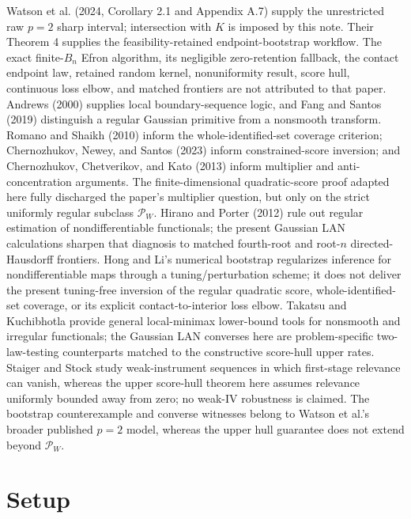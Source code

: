 \documentclass{article}
\begin{document}
Watson et al. (2024, Corollary 2.1 and Appendix A.7) supply the unrestricted raw \(p=2\) sharp interval; intersection with \(K\) is imposed by this note. Their Theorem 4 supplies the feasibility-retained endpoint-bootstrap workflow. The exact finite-\(B_n\) Efron algorithm, its negligible zero-retention fallback, the contact endpoint law, retained random kernel, nonuniformity result, score hull, continuous loss elbow, and matched frontiers are not attributed to that paper. Andrews (2000) supplies local boundary-sequence logic, and Fang and Santos (2019) distinguish a regular Gaussian primitive from a nonsmooth transform. Romano and Shaikh (2010) inform the whole-identified-set coverage criterion; Chernozhukov, Newey, and Santos (2023) inform constrained-score inversion; and Chernozhukov, Chetverikov, and Kato (2013) inform multiplier and anti-concentration arguments. The finite-dimensional quadratic-score proof adapted here fully discharged the paper's multiplier question, but only on the strict uniformly regular subclass \(\mathcal P_W\). Hirano and Porter (2012) rule out regular estimation of nondifferentiable functionals; the present Gaussian LAN calculations sharpen that diagnosis to matched fourth-root and root-\(n\) directed-Hausdorff frontiers. Hong and Li's numerical bootstrap regularizes inference for nondifferentiable maps through a tuning/perturbation scheme; it does not deliver the present tuning-free inversion of the regular quadratic score, whole-identified-set coverage, or its explicit contact-to-interior loss elbow. Takatsu and Kuchibhotla provide general local-minimax lower-bound tools for nonsmooth and irregular functionals; the Gaussian LAN converses here are problem-specific two-law-testing counterparts matched to the constructive score-hull upper rates. Staiger and Stock study weak-instrument sequences in which first-stage relevance can vanish, whereas the upper score-hull theorem here assumes relevance uniformly bounded away from zero; no weak-IV robustness is claimed. The bootstrap counterexample and converse witnesses belong to Watson et al.'s broader published \(p=2\) model, whereas the upper hull guarantee does not extend beyond \(\mathcal P_W\).

\section{Setup}
\end{document}
